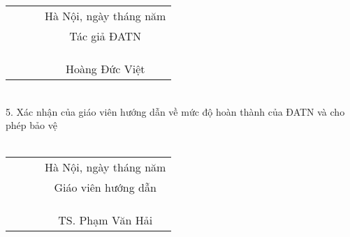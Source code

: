 \begin{acknowledgementslong}
\begin{tabular}{l l l c }
    \textbf{ } \hspace*{35pt} \textbf{ } &  \textbf{ } \hspace*{35pt} \textbf{ } & \textbf{ } \hspace*{35pt} \textbf{ } & Hà Nội, ngày \textbf{  } tháng \textbf{  } năm \textbf{    } \\ 
    \textbf{ } \hspace*{35pt} \textbf{ } &  \textbf{ } \hspace*{35pt} \textbf{ } & \textbf{ } \hspace*{35pt} \textbf{ } & Tác giả ĐATN \\
    \\
    \\
    \\
    \textbf{ } \hspace*{35pt} \textbf{ } &  \textbf{ } \hspace*{35pt} \textbf{ } & \textbf{ } \hspace*{35pt} \textbf{ } & Hoàng Đức Việt
    \end{tabular}\\
    
5. Xác nhận của giáo viên hướng dẫn về mức độ hoàn thành của ĐATN và cho phép bảo vệ \\\\[5cm]
\begin{tabular}{l l l c }
    \textbf{ } \hspace*{35pt} \textbf{ } &  \textbf{ } \hspace*{35pt} \textbf{ } & \textbf{ } \hspace*{35pt} \textbf{ } & Hà Nội, ngày \textbf{  } tháng \textbf{  } năm \textbf{   } \\ 
    \textbf{ } \hspace*{35pt} \textbf{ } &  \textbf{ } \hspace*{35pt} \textbf{ } & \textbf{ } \hspace*{35pt} \textbf{ } & Giáo viên hướng dẫn \\
    \\
    \\
    \\
    \textbf{ } \hspace*{35pt} \textbf{ } &  \textbf{ } \hspace*{35pt} \textbf{ } & \textbf{ } \hspace*{35pt} \textbf{ } & TS. Phạm Văn Hải
    \end{tabular}\\
    
\end{acknowledgementslong}
  